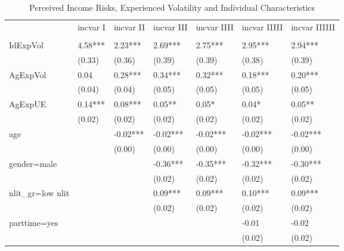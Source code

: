 \begin{table}[p]
\centering
\begin{adjustbox}{width=\textwidth}
\begin{threeparttable}
\caption{Perceived Income Risks, Experienced Volatility and Individual Characteristics}
\label{micro_reg}\begin{tabular}{lllllll}
\toprule
{} & incvar I & incvar II & incvar III & incvar IIII & incvar IIIII & incvar IIIIII \\
                    &          &           &            &             &              &               \\
\midrule
IdExpVol            &  4.58*** &   2.23*** &    2.69*** &     2.75*** &      2.95*** &       2.94*** \\
                    &   (0.33) &    (0.36) &     (0.39) &      (0.39) &       (0.38) &        (0.39) \\
AgExpVol            &     0.04 &   0.28*** &    0.34*** &     0.32*** &      0.18*** &       0.20*** \\
                    &   (0.04) &    (0.04) &     (0.05) &      (0.05) &       (0.05) &        (0.05) \\
AgExpUE             &  0.14*** &   0.08*** &     0.05** &       0.05* &        0.04* &        0.05** \\
                    &   (0.02) &    (0.02) &     (0.02) &      (0.02) &       (0.02) &        (0.02) \\
age                 &          &  -0.02*** &   -0.02*** &    -0.02*** &     -0.02*** &      -0.02*** \\
                    &          &    (0.00) &     (0.00) &      (0.00) &       (0.00) &        (0.00) \\
gender=male         &          &           &   -0.36*** &    -0.35*** &     -0.32*** &      -0.30*** \\
                    &          &           &     (0.02) &      (0.02) &       (0.02) &        (0.02) \\
nlit\_gr=low nlit    &          &           &    0.09*** &     0.09*** &      0.10*** &       0.09*** \\
                    &          &           &     (0.02) &      (0.02) &       (0.02) &        (0.02) \\
parttime=yes        &          &           &            &             &        -0.01 &         -0.02 \\
                    &          &           &            &             &       (0.02) &        (0.02) \\

\end{tabular}
\end{threeparttable}
\end{adjustbox}
\end{table}
